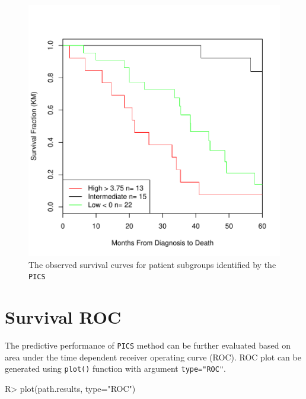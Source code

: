 \documentclass[11pt]{article}
\begin{document}
\begin{figure}[tbh]
\begin{center}
\includegraphics{PICS-example-plot}
\caption{The observed survival curves for patient subgroups identified by the \texttt{PICS}}
\end{center}
\end{figure}

\section{Survival ROC}

The predictive performance of \texttt{PICS} method can be further evaluated based on area under the time dependent receiver operating curve (ROC).
ROC plot can be generated using \texttt{plot()} function with argument \texttt{type="{}ROC"{}}.
\begin{Schunk}
\begin{Sinput}
R> plot(path.results, type="ROC")
\end{Sinput}
\end{Schunk}
\end{document}
